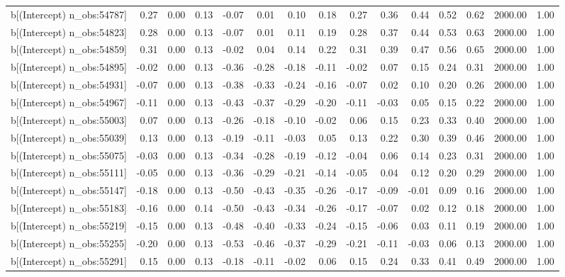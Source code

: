 \begin{table}[ht]
\begin{tabular}{rrrrrrrrrrrrrrr}
  b[(Intercept) n\_obs:54787] & 0.27 & 0.00 & 0.13 & -0.07 & 0.01 & 0.10 & 0.18 & 0.27 & 0.36 & 0.44 & 0.52 & 0.62 & 2000.00 & 1.00 \\ 
  b[(Intercept) n\_obs:54823] & 0.28 & 0.00 & 0.13 & -0.07 & 0.01 & 0.11 & 0.19 & 0.28 & 0.37 & 0.44 & 0.53 & 0.63 & 2000.00 & 1.00 \\ 
  b[(Intercept) n\_obs:54859] & 0.31 & 0.00 & 0.13 & -0.02 & 0.04 & 0.14 & 0.22 & 0.31 & 0.39 & 0.47 & 0.56 & 0.65 & 2000.00 & 1.00 \\ 
  b[(Intercept) n\_obs:54895] & -0.02 & 0.00 & 0.13 & -0.36 & -0.28 & -0.18 & -0.11 & -0.02 & 0.07 & 0.15 & 0.24 & 0.31 & 2000.00 & 1.00 \\ 
  b[(Intercept) n\_obs:54931] & -0.07 & 0.00 & 0.13 & -0.38 & -0.33 & -0.24 & -0.16 & -0.07 & 0.02 & 0.10 & 0.20 & 0.26 & 2000.00 & 1.00 \\ 
  b[(Intercept) n\_obs:54967] & -0.11 & 0.00 & 0.13 & -0.43 & -0.37 & -0.29 & -0.20 & -0.11 & -0.03 & 0.05 & 0.15 & 0.22 & 2000.00 & 1.00 \\ 
  b[(Intercept) n\_obs:55003] & 0.07 & 0.00 & 0.13 & -0.26 & -0.18 & -0.10 & -0.02 & 0.06 & 0.15 & 0.23 & 0.33 & 0.40 & 2000.00 & 1.00 \\ 
  b[(Intercept) n\_obs:55039] & 0.13 & 0.00 & 0.13 & -0.19 & -0.11 & -0.03 & 0.05 & 0.13 & 0.22 & 0.30 & 0.39 & 0.46 & 2000.00 & 1.00 \\ 
  b[(Intercept) n\_obs:55075] & -0.03 & 0.00 & 0.13 & -0.34 & -0.28 & -0.19 & -0.12 & -0.04 & 0.06 & 0.14 & 0.23 & 0.31 & 2000.00 & 1.00 \\ 
  b[(Intercept) n\_obs:55111] & -0.05 & 0.00 & 0.13 & -0.36 & -0.29 & -0.21 & -0.14 & -0.05 & 0.04 & 0.12 & 0.20 & 0.29 & 2000.00 & 1.00 \\ 
  b[(Intercept) n\_obs:55147] & -0.18 & 0.00 & 0.13 & -0.50 & -0.43 & -0.35 & -0.26 & -0.17 & -0.09 & -0.01 & 0.09 & 0.16 & 2000.00 & 1.00 \\ 
  b[(Intercept) n\_obs:55183] & -0.16 & 0.00 & 0.14 & -0.50 & -0.43 & -0.34 & -0.26 & -0.17 & -0.07 & 0.02 & 0.12 & 0.18 & 2000.00 & 1.00 \\ 
  b[(Intercept) n\_obs:55219] & -0.15 & 0.00 & 0.13 & -0.48 & -0.40 & -0.33 & -0.24 & -0.15 & -0.06 & 0.03 & 0.11 & 0.19 & 2000.00 & 1.00 \\ 
  b[(Intercept) n\_obs:55255] & -0.20 & 0.00 & 0.13 & -0.53 & -0.46 & -0.37 & -0.29 & -0.21 & -0.11 & -0.03 & 0.06 & 0.13 & 2000.00 & 1.00 \\ 
  b[(Intercept) n\_obs:55291] & 0.15 & 0.00 & 0.13 & -0.18 & -0.11 & -0.02 & 0.06 & 0.15 & 0.24 & 0.33 & 0.41 & 0.49 & 2000.00 & 1.00 \\ 

\end{tabular}
\end{table}
